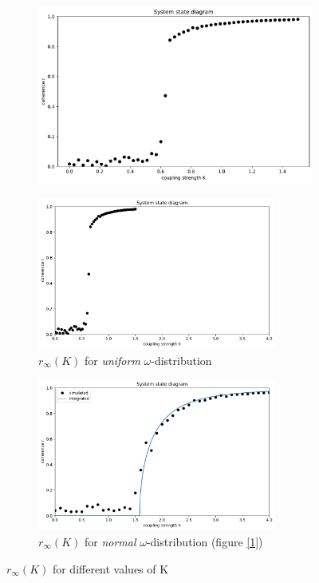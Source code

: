 \documentclass[11pt,a4paper]{article}
\begin{document}
\begin{figure}[h]
	\centering
	\begin{subfigure}{0.9\textwidth}
		\includegraphics[width = \textwidth]{graphics/3_K-vs-r_omegaDistr=uniform_zoomed_N=2000_1611568972.pdf}
		\caption{}
		\label{3zoomedin}
	\end{subfigure}
	
	\begin{subfigure}[t]{0.47\textwidth}
		\includegraphics[height = 50mm]{graphics/3_K-vs-r_omegaDistr=uniform_N=2000_1611568972.pdf}
		\caption{$r_\infty(K)$ for \textit{uniform} $\omega$-distribution}
		\label{3zoomedout}
	\end{subfigure}
	\begin{subfigure}[t]{0.47\textwidth}
		\includegraphics[height = 50mm]{graphics/1_K-vs-r_omegaDistr=normal_N=1000_1611593606.pdf}
		\caption{$r_\infty(K)$ for \textit{normal} $\omega$-distribution (figure \ref{1})}
		\label{3-1}
	\end{subfigure}
	\caption{$r_\infty(K)$ for different values of K}
	\label{3}
\end{figure}
\end{document}
